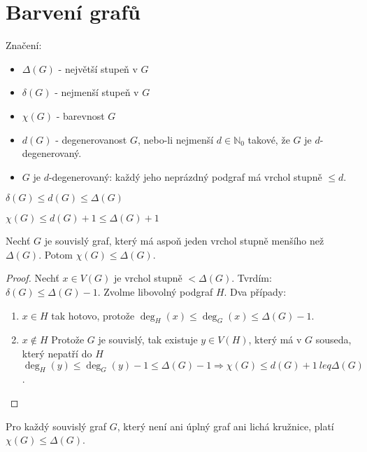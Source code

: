 \chapter{Barvení grafů}

\begin{definice}
	Značení:
	
	\begin{itemize}
		\item $\Delta(G)$ - největší stupeň v $G$
		\item $\delta(G)$ - nejmenší stupeň v $G$
		\item $\chi(G)$ - barevnost $G$
		\item $d(G)$ - degenerovanost $G$, nebo-li nejmenší $d \in \mathbb{N}_{0}$ takové, že $G$ je $d$-degenerovaný.
		\item $G$ je $d$-degenerovaný: každý jeho neprázdný podgraf má vrchol stupně $\leq d$.
	\end{itemize}
\end{definice}

\begin{pozor}
	$\delta (G) \leq d(G) \leq \Delta (G)$
\end{pozor}

\begin{pozor}
	$\chi (G) \leq d(G) +1 \leq \Delta (G) + 1$
\end{pozor}

\begin{lemma}
	Nechť $G$ je souvislý graf, který má aspoň jeden vrchol stupně menšího než $\Delta (G)$. Potom $\chi(G) \leq \Delta(G)$.
\end{lemma}

\begin{proof}
	Nechť $x \in V(G)$ je vrchol stupně $< \Delta (G)$. Tvrdím: $\delta (G) \leq \Delta (G) -1$. Zvolme libovolný podgraf $H$. Dva případy:
	
	\begin{enumerate}
		\item $x \in H$ tak hotovo, protože $\deg_{H}(x) \leq \deg_{G}(x) \leq \Delta(G) -1$.
		\item $x \notin H$ Protože $G$ je souvislý, tak existuje $y \in V(H)$, který má v $G$ souseda, který nepatří do $H$ $\deg_{H}(y) \leq \deg_{G}(y) - 1 \leq \Delta(G) - 1 \Rightarrow \chi(G) \leq d(G) + 1\ leq \Delta (G)$.
	\end{enumerate}
\end{proof}

\begin{veta}[Brooks]
	Pro každý souvislý graf $G$, který není ani úplný graf ani lichá kružnice, platí $\chi(G) \leq \Delta (G)$.
\end{veta}


